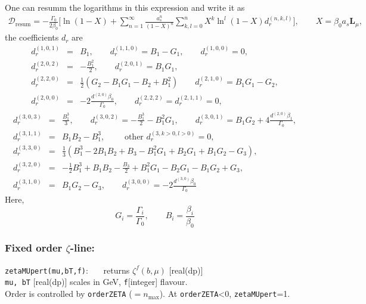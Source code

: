 \documentclass[prd,nofootinbib,eqsecnum,final]{revtex4}
\renewcommand{\(}{\left(}
\renewcommand{\)}{\right)}
\renewcommand{\[}{\left[}
\renewcommand{\]}{\right]}
\begin{document}
One can resumm the logarithms in this expression and write it as
\begin{eqnarray}
\mathcal{D}_{\text{resum}}=-\frac{\Gamma_0}{2\beta_0}\Big[\ln(1-X)+\sum_{n=1}^\infty \frac{a_s^n}{(1-X)^n}\sum_{k,l=0}^n X^k \ln^l(1-X)d_r^{(n,k,l)}\Big],\qquad X=\beta_0 a_s \mathbf{L}_\mu,
\end{eqnarray}
the coefficients $d_r$ are 
\begin{eqnarray*}
d_r^{(1,0,1)}&=&B_1,\qquad d_r^{(1,1,0)}=B_1-G_1,\qquad d_r^{(1,0,0)}=0,
\\
d_r^{(2,0,2)}&=&-\frac{B^2_1}{2},\qquad d_r^{(2,0,1)}=B_1G_1,
\\
d_r^{(2,2,0)}&=&\frac{1}{2}\(G_2-B_1G_1-B_2+B_1^2\)
\qquad
d_r^{(2,1,0)}=B_1G_1-G_2,
\\
d_r^{(2,0,0)}&=&-2\frac{d^{(2,0)}\beta_0}{\Gamma_0},\qquad d_r^{(2,2,2)}=d_r^{(2,1,1)}=0,
\end{eqnarray*}
\begin{eqnarray*}
d_r^{(3,0,3)}&=&\frac{B_1^3}{3},\qquad d_r^{(3,0,2)}=-\frac{B_1^3}{2}-B_1^2G_1,
\qquad d_r^{(3,0,1)}=B_1G_2+4\frac{d^{(2,0)}\beta_1}{\Gamma_0},
\\
d_r^{(3,1,1)}&=&B_1B_2-B_1^3,\qquad \text{ other }d^{(3,k>0,l>0)}_r=0,
\\
d_r^{(3,3,0)}&=&\frac{1}{3}\(B_1^3-2B_1B_2+B_3-B_1^2G_1+B_2G_1+B_1G_2-G_3\),
\\
d_r^{(3,2,0)}&=&-\frac{1}{2}B_1^3+B_1B_2-\frac{B_3}{2}+B_1^2G_1-B_2G_1-B_1G_2+G_3,
\\
d_r^{(3,1,0)}&=&B_1G_2-G_3,\qquad d_r^{(3,0,0)}=-2\frac{d^{(3,0)}\beta_0}{\Gamma_0}
\end{eqnarray*}
Here,
$$G_i=\frac{\Gamma_i}{\Gamma_0},\qquad B_i=\frac{\beta_i}{\beta_0}$$

\subsubsection{Fixed order $\zeta$-line:}
\begin{tcolorbox}
\texttt{zetaMUpert(mu,bT,f)}: ~~~returns $\zeta^f(b,\mu)$ [real(dp)]
\\
\texttt{mu, bT} [real(dp)] scales in GeV, \texttt{f}[integer] flavour. 
\\
Order is controlled by \texttt{orderZETA} ($=n_{\text{max}}$). At \texttt{orderZETA}<0, \texttt{zetaMUpert}=1.
\end{tcolorbox}
\end{document}
